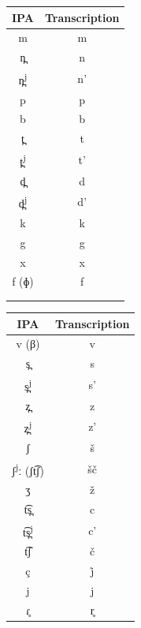 \documentclass[a4paper, 12pt]{article}
\begin{document}
\begin{minipage}[t]{.3\linewidth}
\begin{table}[H]
\begin{tabular}{cc}
\toprule
IPA        & Transcription \\
\bottomrule
m          & m                       \\
n̪         & n                       \\
n̪\textsuperscript{j}        & n'                      \\
p          & p                       \\
b          & b                       \\
t̪         & t                       \\
t̪\textsuperscript{j}        & t'                      \\
d̪         & d                       \\
d̪\textsuperscript{j}        & d'                      \\
k          & k                       \\
g          & g                       \\
x          & x                       \\
f (ɸ)      & f                       \\
     &                  \\
     \addlinespace[0.065cm]
\bottomrule
\end{tabular}
\end{table}
\end{minipage}
\hfill
\begin{minipage}[t]{.3\linewidth}
\begin{table}[H]
\begin{tabular}{cc}
\toprule
IPA        & Transcription \\
\bottomrule
v (β)      & v                       \\
s̪         & s                       \\
s̪\textsuperscript{j}        & s'                      \\
z̪         & z                       \\
z̪\textsuperscript{j}         & z'                      \\
ʃ          & š                       \\
ʃ\textsuperscript{j}ː (ʃt͡ʃ) & šč                      \\
ʒ          & ž                       \\
t͡s̪       & c                       \\
t͡s̪\textsuperscript{j}      & c'                      \\
t͡ʃ        & č                       \\
ç         & j̊                      \\
j          & j                       \\
ɾ̥         & r̥                      \\
\bottomrule
\end{tabular}
\end{table}
\end{minipage}	
\end{document}
